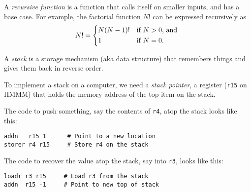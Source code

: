 \documentclass[8pt,a4paper,compress,handout]{beamer}
\begin{document}
\begin{frame}[fragile]
A \emph{recursive function} is a function that calls itself on smaller inputs, and has a base case. For example, the factorial function $N!$ can be expressed recursively as 
\[
N! = \begin{dcases*}
N(N-1)! & if $N > 0$, and \\
1       & if $N=0$.
\end{dcases*}
\]

\bigskip

A \emph{stack} is a storage mechanism (aka data structure) that remembers things and gives them back in reverse order.

\bigskip

To implement a stack on a computer, we need a \emph{stack pointer}, a register (\lstinline{r15} on HMMM) that holds the memory address of the top item on the stack.

\bigskip

The code to push something, say the contents of \lstinline{r4}, atop the stack looks like this:
\begin{lstlisting}[language={}]
addn   r15 1      # Point to a new location
storer r4 r15     # Store r4 on the stack
\end{lstlisting}

\bigskip

The code to recover the value atop the stack, say into \lstinline{r3}, looks like this:
\begin{lstlisting}[language={}]
loadr r3 r15     # Load r3 from the stack
addn  r15 -1     # Point to new top of stack
\end{lstlisting}
\end{frame}
\end{document}
